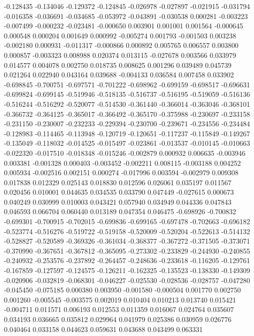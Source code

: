 -0.128435
-0.134046
-0.129372
-0.124845
-0.026978
-0.027897
-0.021915
-0.031794
-0.016358
-0.036691
-0.034685
-0.053972
-0.043891
-0.030538
0.000281
-0.003223
-0.007499
-0.000232
-0.023481
-0.000650
0.003901
0.001001
0.001564
-0.000645
0.000548
0.000204
0.001649
0.000992
-0.005274
0.001793
-0.001503
0.003238
-0.002180
0.000931
-0.011317
-0.000866
0.000892
0.005765
0.006557
0.003800
0.000857
-0.003323
0.008988
0.020374
0.013115
-0.027678
0.003566
0.033979
0.014577
0.004078
0.002750
0.018735
0.008625
0.001296
0.039489
0.045739
0.021264
0.022940
0.043164
0.039688
-0.004133
0.036584
0.007458
0.033902
-0.698845
-0.700751
-0.697571
-0.701222
-0.698962
-0.699159
-0.698517
-0.696631
-0.699824
-0.699145
-0.519946
-0.518135
-0.516737
-0.516195
-0.519059
-0.516136
-0.516244
-0.516292
-0.520077
-0.514530
-0.361440
-0.366014
-0.363046
-0.368101
-0.366732
-0.364125
-0.365017
-0.366492
-0.365170
-0.375988
-0.230697
-0.233158
-0.231150
-0.230007
-0.232233
-0.229394
-0.230700
-0.239671
-0.234556
-0.234484
-0.128983
-0.114465
-0.113948
-0.120719
-0.120651
-0.117237
-0.115849
-0.149267
-0.135049
-0.118032
-0.014525
-0.015497
-0.023861
-0.013537
-0.010145
-0.010663
-0.022320
-0.017510
-0.018348
-0.015246
-0.002879
0.000932
0.006635
-0.003946
0.003381
-0.001328
0.000403
-0.003452
-0.002211
0.008115
-0.003188
0.004252
0.005934
-0.002516
0.002151
0.000274
-0.017996
0.003594
-0.002979
0.009308
0.017838
0.012329
0.025143
0.018830
0.012596
0.026061
0.035197
0.011567
0.020456
0.010001
0.044635
0.034535
0.033790
0.047449
-0.027615
0.000673
0.040249
0.030999
0.010003
0.043421
0.057940
0.034949
0.044336
0.047843
0.046593
0.066704
0.060440
0.013189
0.047354
0.046475
-0.698926
-0.700832
-0.699301
-0.700915
-0.702015
-0.699836
-0.699165
-0.697478
-0.702663
-0.696182
-0.523774
-0.516276
-0.519722
-0.519158
-0.520009
-0.520204
-0.522613
-0.514132
-0.528827
-0.520589
-0.369326
-0.361034
-0.368377
-0.367272
-0.371505
-0.373071
-0.370990
-0.367651
-0.367812
-0.365095
-0.273302
-0.233829
-0.244930
-0.240855
-0.240932
-0.253576
-0.237892
-0.264457
-0.248636
-0.233618
-0.116205
-0.129761
-0.167859
-0.127597
-0.124575
-0.126211
-0.162325
-0.135523
-0.138330
-0.149309
-0.020906
-0.032819
-0.068301
-0.046227
-0.025530
-0.028536
-0.028757
-0.047280
-0.045450
-0.075185
0.000380
0.003950
-0.001580
-0.000504
0.001770
0.002750
0.001260
-0.005545
-0.003575
0.002019
0.010404
0.010213
0.013740
0.015421
-0.004711
0.011571
0.006193
0.012553
0.011359
0.016067
0.024764
0.035607
0.034193
0.036665
0.035812
0.029964
0.041979
0.025386
0.030959
0.026776
0.040464
0.033158
0.044623
0.059631
0.043688
0.043499
0.063331
